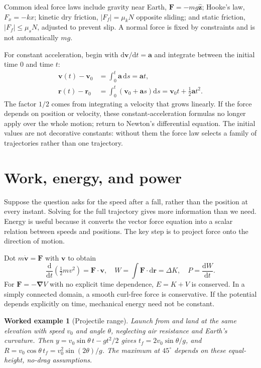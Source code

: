 \documentclass[11pt,oneside]{book}
\newcommand{\dd}{\mathrm{d}}
\newcommand{\vect}[1]{\boldsymbol{#1}}
\newcommand{\grad}{\boldsymbol{\nabla}}
\newcommand{\od}[2]{\frac{\dd #1}{\dd #2}}
\theoremstyle{reviewstyle}
\newtheorem{example}{Worked example}[chapter]
\begin{document}
Common ideal force laws include gravity near Earth, $\vect F=-mg\hat{\vect z}$; Hooke's law, $F_x=-kx$; kinetic dry friction, $|F_f|=\mu_kN$ opposite sliding; and static friction, $|F_f|\leq\mu_sN$, adjusted to prevent slip. A normal force is fixed by constraints and is not automatically $mg$.

For constant acceleration, begin with $\dd\vect v/\dd t=\vect a$ and integrate between the initial time $0$ and time $t$:
\begin{align}
\vect v(t)-\vect v_0&=\int_0^t\vect a\,\dd s=\vect at,\\
\vect r(t)-\vect r_0&=\int_0^t(\vect v_0+\vect as)\dd s
=\vect v_0t+\tfrac12\vect at^2.
\end{align}
The factor $1/2$ comes from integrating a velocity that grows linearly. If the force depends on position or velocity, these constant-acceleration formulas no longer apply over the whole motion; return to Newton's differential equation. The initial values are not decorative constants: without them the force law selects a family of trajectories rather than one trajectory.

\section{Work, energy, and power}
Suppose the question asks for the speed after a fall, rather than the position at every instant. Solving for the full trajectory gives more information than we need. Energy is useful because it converts the vector force equation into a scalar relation between speeds and positions. The key step is to project force onto the direction of motion.

Dot $m\dot{\vect v}=\vect F$ with $\vect v$ to obtain
\begin{equation}
\od{}{t}\left(\tfrac12mv^2\right)=\vect F\cdot\vect v,
\quad W=\int\vect F\cdot\dd\vect r=\Delta K,
\quad P=\od{W}{t}.
\end{equation}
For $\vect F=-\grad V$ with no explicit time dependence, $E=K+V$ is conserved. In a simply connected domain, a smooth curl-free force is conservative. If the potential depends explicitly on time, mechanical energy need not be constant.
\begin{example}[Projectile range]
Launch from and land at the same elevation with speed $v_0$ and angle $\theta$, neglecting air resistance and Earth's curvature. Then $y=v_0\sin\theta\,t-gt^2/2$ gives $t_f=2v_0\sin\theta/g$, and $R=v_0\cos\theta\,t_f=v_0^2\sin(2\theta)/g$. The maximum at $45^\circ$ depends on these equal-height, no-drag assumptions.
\end{example}
\end{document}
